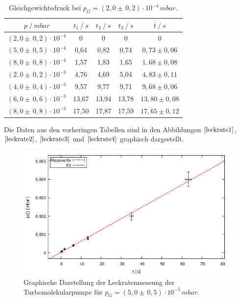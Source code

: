 \begin{table}[H]
\centering
\begin{tabular}{c|c|c|c|c}
	{$p \:/\: \si{mbar}$} & {$t_1 \:/\: \si{s} $} & {$t_2 \:/\: \si{s} $} & {$t_3 \:/\: \si{s} $} & {$\bar{t} \:/\: \si{s}$}\\
\midrule
$(2,0 \pm \, 0,2)\cdot 10^{-4}$ &0 &0 &0 &0\\
$(5,0 \pm \, 0,5)\cdot 10^{-4}$ &   0,64 &  0,82 &  0,74 & $0,73 \pm 0,06$\\
$(8,0 \pm \, 0,8)\cdot 10^{-4}$ &   1,57  &  1,83 &  1,65 & $1,68 \pm 0,08$\\
$(2,0 \pm \, 0,2)\cdot 10^{-3}$ &   4,76 &  4,69 &  5,04 & $4,83 \pm 0,11$\\
$(4,0 \pm \, 0,4)\cdot 10^{-3}$ &   9,57 &  9,77 &  9,71 & $9,68 \pm 0,06$\\
$(6,0 \pm \, 0,6)\cdot 10^{-3}$ &   13,67 &  13,94 &  13,78 & $13,80 \pm 0,08$\\
$(8,0 \pm \, 0,8)\cdot 10^{-3}$ &  17,50 & 17,87 & 17,59 & $17,65 \pm 0,12$\\
\end{tabular}
\caption{Gleichgewichtsdruck bei $p_G=(2,0 \pm \, 0,2)\cdot 10^{-4} \, \si{mbar}$.}
\label{tab:leck_Turbo4}
\end{table}
Die Daten aus den vorheringen Tabellen sind in den Abbildungen $\ref{leckrate1}$, $\ref{leckrate2}$, $\ref{leckrate3}$ und $\ref{leckrate4}$ graphisch dargestellt.
\begin{figure}[H]
  \centering
  \includegraphics[width=14cm]{bilder/leckratefit1.png}
  \caption{Graphische Darstellung der Leckratenmessung der Turbomolekularpumpe für $p_G=(5,0 \pm \, 0,5)\cdot 10^{-5} \, \si{mbar}$.}
  \label{leckrate1}
\end{figure}
